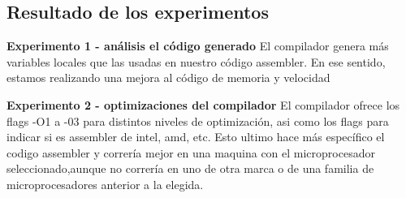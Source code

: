 \subsection{Resultado de los experimentos}

\vspace*{0.3cm} \noindent
\textbf{Experimento 1 - análisis el código generado}
El compilador genera más variables locales que las usadas en nuestro c\'odigo assembler. En ese sentido, estamos realizando una mejora al c\'odigo de memoria y velocidad


\vspace*{0.3cm} \noindent
\textbf{Experimento 2 - optimizaciones del compilador}
El compilador ofrece los flags -O1 a -03 para distintos niveles de optimizaci\'on, asi como los flags para indicar si es assembler de intel, amd, etc. Esto ultimo hace m\'as espec\'ifico el codigo assembler y correr\'ia mejor en una maquina con el microprocesador seleccionado,aunque no correr\'ia en uno de otra marca o de una familia de microprocesadores anterior a la elegida.
